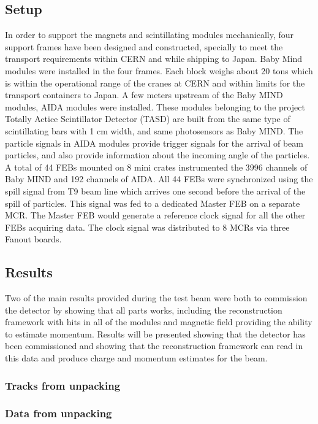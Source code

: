 \subsection{Setup}

In order to support the magnets and scintillating modules mechanically, four support frames have been designed and constructed, specially to meet the transport requirements within CERN and while shipping to Japan. Baby Mind modules were installed in the four frames. Each block weighs about 20 tons which is within the operational range of the cranes at CERN and within limits for the transport containers to Japan.
A few meters upstream of the Baby MIND modules, AIDA modules were installed. These modules belonging to the project Totally Actice Scintillator Detector (TASD) are built from the same type of scintillating bars with 1 cm width, and same photosensors as Baby MIND. The particle signals in AIDA modules provide trigger signals for the arrival of beam particles, and also provide information about the incoming angle of the particles. A total of 44 FEBs mounted on 8 mini crates instrumented the 3996 channels of Baby MIND and 192 channels of AIDA.
All 44 FEBs were synchronized using the spill signal from T9 beam line which arrives one second before the arrival of the spill of particles. This signal was fed to a dedicated Master FEB on a separate MCR. The Master FEB would generate a reference clock signal for all the other FEBs acquiring data. The clock signal was distributed to 8 MCRs via three Fanout boards.

\subsection{Results}
Two of the main results provided during the test beam were both to commission the detector by showing that all parts works, including the reconstruction framework with hits in all of the modules and magnetic field providing the ability to estimate momentum. Results will be presented showing that the detector has been commissioned and showing that the reconstruction framework can read in this data and produce charge and momentum estimates for the beam.

\subsubsection{Tracks from unpacking}

\subsubsection{Data from unpacking}


